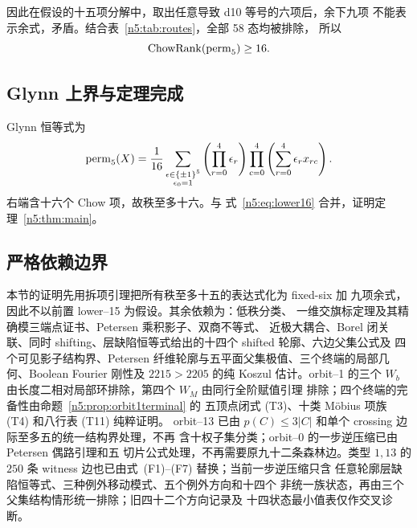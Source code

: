 因此在假设的十五项分解中，取出任意导致 d10 等号的六项后，余下九项
不能表示余式，矛盾。结合表~\ref{n5:tab:routes}，全部 58 态均被排除，
所以
\begin{equation}\label{n5:eq:lower16}
 \operatorname{ChowRank}(\operatorname{perm}_5)\ge16.
\end{equation}

\subsection{Glynn 上界与定理完成}

Glynn 恒等式为
\begin{equation}\label{n5:eq:glynn}
 \operatorname{perm}_5(X)=\frac1{16}
 \sum_{\substack{\epsilon\in\{\pm1\}^5\\ \epsilon_0=1}}
 \left(\prod_{r=0}^4\epsilon_r\right)
 \prod_{c=0}^4\left(\sum_{r=0}^4\epsilon_rx_{rc}\right).
\end{equation}
右端含十六个 Chow 项，故秩至多十六。与
式~\eqref{n5:eq:lower16} 合并，证明定理~\ref{n5:thm:main}。

\subsection{严格依赖边界}

本节的证明先用拆项引理把所有秩至多十五的表达式化为 fixed-six 加
九项余式，因此不以前置 lower--15 为假设。其余依赖为：低秩分类、
一维交旗标定理及其精确模三端点证书、Petersen 乘积影子、双商不等式、
近极大耦合、Borel 闭关联、同时
shifting、层缺陷恒等式给出的十四个 shifted 轮廓、六边父集公式及
四个可见影子结构界、Petersen 纤维轮廓与五平面父集极值、三个终端的局部几何、Boolean
Fourier 刚性及 \(2215>2205\) 的纯 Koszul 估计。orbit--1 的三个
\(W_b\) 由长度二相对局部环排除，第四个 \(W_M\) 由同行全阶赋值引理
排除；四个终端的完备性由命题~\ref{n5:prop:orbit1terminal} 的
五顶点闭式 (T3)、十类 Möbius 项族 (T4) 和八行表 (T11) 纯粹证明。
orbit--13 已由
\(p(C)\le3|C|\) 和单个 crossing 边际至多五的统一结构界处理，不再
含十权子集分类；orbit--0 的一步逆压缩已由 Petersen 偶路引理和五
切片公式处理，不再需要原九十二条森林边。类型 \(1,13\) 的
\(250\) 条 witness 边也已由式~(F1)--(F7) 替换；当前一步逆压缩只含
任意轮廓层缺陷恒等式、三种例外移动模式、五个例外方向和十四个
非统一族状态，再由三个父集结构情形统一排除；旧四十二个方向记录及
十四状态最小值表仅作交叉诊断。

